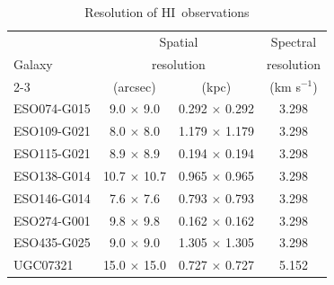 \documentclass[traditabstract]{aa} %
\newcommand\HI{H{\small I}}
\begin{document}
\begin{table}[t] %
\centering 
\caption[Spatial \& spectral resolution of \HI\ observations]{Resolution of 
\HI\ observations}
\label{tab:resol-HI}
\begin{tabular}{lccc}
\hline
 & \multicolumn{2}{c}{Spatial} & Spectral \\
Galaxy & \multicolumn{2}{c}{resolution} & resolution \\
\cline{2-3}
& (arcsec) & (kpc) & (km s$^{-1}$)\\
\hline\hline
ESO074-G015 &   9.0 $\times$ 9.0  & 0.292 $\times$ 0.292 &   3.298 \\
ESO109-G021 &   8.0 $\times$ 8.0  & 1.179 $\times$ 1.179 &   3.298 \\
ESO115-G021 &   8.9 $\times$ 8.9  & 0.194 $\times$ 0.194 &   3.298 \\
ESO138-G014 &  10.7 $\times$ 10.7 & 0.965 $\times$ 0.965 &   3.298 \\
ESO146-G014 &   7.6 $\times$ 7.6  & 0.793 $\times$ 0.793 &   3.298 \\
ESO274-G001 &   9.8 $\times$ 9.8  & 0.162 $\times$ 0.162 &   3.298 \\
ESO435-G025 &   9.0 $\times$ 9.0  & 1.305 $\times$ 1.305 &   3.298 \\
UGC07321    &  15.0 $\times$ 15.0 & 0.727 $\times$ 0.727 &   5.152 \\
\hline
\end{tabular}
\end{table}
\end{document}
